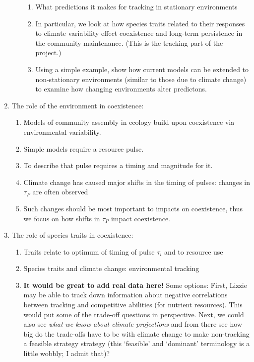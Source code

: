 \documentclass[11pt,letterpaper]{article}
\begin{document}
\begin{enumerate}
\begin{enumerate}
\begin{enumerate}
\item What predictions it makes for tracking in stationary environments
\item In particular, we look at how species traits related to their responses to climate variability effect coexistence and long-term persistence in the community maintenance. (This is the tracking part of the project.) 
\item Using a simple example, show how current models can be extended to non-stationary environments (similar to those due to climate change) to examine how changing environments alter predictons.
\end{enumerate}
\end{enumerate}
\item The role of the environment in coexistence:
\begin{enumerate}
\item Models of community assembly in ecology build upon coexistence via environmental variability. %
\item Simple models require a resource pulse.
\item To describe that pulse requires a timing and magnitude for it.  %
\item Climate change has caused major shifts in the timing of pulses: changes in $\tau_{P}$ are often observed 
\item Such changes should be most important to impacts on coexistence, thus we focus on how shifts in $\tau_{P}$ impact coexistence.
\end{enumerate}
\item The role of species traits in coexistence:
\begin{enumerate}
\item Traits relate to optimum of timing of pulse $\tau_{i}$  and to resource use 
\item Species traits and climate change: environmental tracking
\item {\bf It would be great to add real data here!} Some options: First, Lizzie may be able to track down information about negative correlations between tracking and competitive abilities (for nutrient resources). This would put some of the trade-off questions in perspective. Next, we could also see  \emph{what we know about climate projections} and from there see how big do the trade-offs have to be with climate change to make non-tracking a feasible strategy strategy (this `feasible' and `dominant' terminology is a little wobbly; I admit that)?

\end{enumerate}
\end{enumerate}
\end{document}
